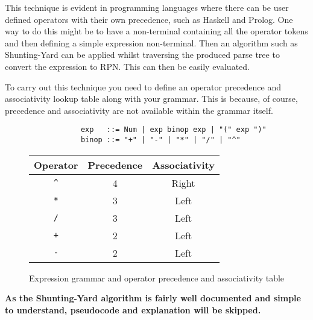 This technique is evident in programming languages where there can be user defined operators with their own precedence, such as Haskell and Prolog. One way to do this might be to have a non-terminal containing all the operator tokens and then defining a simple expression non-terminal. Then an algorithm such as Shunting-Yard can be applied whilst traversing the produced parse tree to convert the expression to RPN. This can then be easily evaluated.

To carry out this technique you need to define an operator precedence and associativity lookup table along with your grammar. This is because, of course, precedence and associativity are not available within the grammar itself.

\begin{figure}[H]
    \begin{center}
        \begin{verbatim}
            exp   ::= Num | exp binop exp | "(" exp ")"
            binop ::= "+" | "-" | "*" | "/" | "^"
        \end{verbatim}
        \vspace{1em}
        \begin{tabular}{| c | c | c |}
            \hline
            Operator & Precedence & Associativity\\
            \hline
            \verb|^| & 4 & Right\\
            \hline
            \verb|*| & 3 & Left\\
            \hline
            \verb|/| & 3 & Left\\
            \hline
            \verb|+| & 2 & Left\\
            \hline
            \verb|-| & 2 & Left\\
            \hline
        \end{tabular}
    \end{center}
    \vspace{-1em}
    \caption{\label{fig:4.6}Expression grammar and operator precedence and associativity table}
\end{figure}

\textbf{As the Shunting-Yard algorithm is fairly well documented and simple to understand, pseudocode and explanation will be skipped.}

